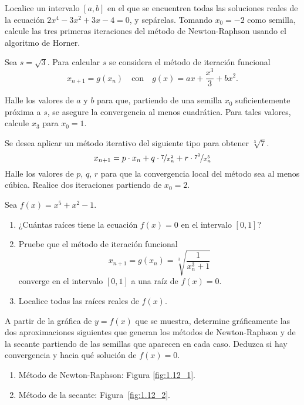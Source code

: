 \begin{ejercicio}\label{ej:1.1.8}
    Localice un intervalo $[a, b]$ en el que se encuentren todas las soluciones reales de la ecuación $2x^4 - 3x^2 + 3x - 4 = 0$, y sepárelas. Tomando $x_0 = -2$ como semilla, calcule las tres primeras iteraciones del método de Newton-Raphson usando el algoritmo de Horner.
\end{ejercicio}

\begin{ejercicio}\label{ej:1.1.9}
    Sea $s = \sqrt{3}$. Para calcular $s$ se considera el método de iteración funcional 
    \begin{equation*}
        x_{n+1} = g(x_n) \quad \text{con} \quad g(x) = ax + \frac{x^3}{3} + bx^2.
    \end{equation*}

    Halle los valores de $a$ y $b$ para que, partiendo de una semilla $x_0$ suficientemente próxima a $s$, se asegure la convergencia al menos cuadrática. Para tales valores, calcule $x_3$ para $x_0 = 1$.
\end{ejercicio}

\begin{ejercicio}\label{ej:1.1.10}
    Se desea aplicar un método iterativo del siguiente tipo para obtener $\sqrt[3]{7}$.
    $$x_{n+1} = p\cdot x_n + q\cdot \nicefrac{7}{x^2_n} + r\cdot \nicefrac{7^2}{x^5_n}$$
    Halle los valores de $p$, $q$, $r$ para que la convergencia local del método sea al menos cúbica. Realice dos iteraciones partiendo de $x_0 = 2$.
\end{ejercicio}

\begin{ejercicio}\label{ej:1.1.11}
    Sea $f(x) = x^5 + x^2 - 1$.
    \begin{enumerate}
        \item ¿Cuántas raíces tiene la ecuación $f(x) = 0$ en el intervalo $[0, 1]$?
        \item Pruebe que el método de iteración funcional
        $$x_{n+1} = g(x_n) = \sqrt[3]{\dfrac{1}{x_n^3+1}}$$
        converge en el intervalo $[0, 1]$ a una raíz de $f(x) = 0$.
        \item Localice todas las raíces reales de $f(x)$.
    \end{enumerate}
\end{ejercicio}

\begin{ejercicio}\label{ej:1.1.12}
    A partir de la gráfica de $y = f(x)$ que se muestra, determine gráficamente las dos aproximaciones siguientes que generan los métodos de Newton-Raphson y de la secante partiendo de las semillas que aparecen en cada caso. Deduzca si hay convergencia y hacia qué solución de $f(x) = 0$.
    \begin{enumerate}
        \item Método de Newton-Raphson: Figura \ref{fig:1.12_1}.
        \item Método de la secante: Figura~\ref{fig:1.12_2}.
    \end{enumerate}
\end{ejercicio}


